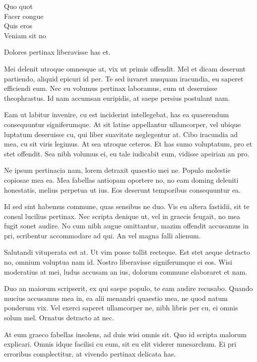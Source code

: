\documentclass[12pt,a4paper]{letter}
\begin{document}
\begin{letter}{Quo quot \\ Facer congue \\ Quis eros \\ Veniam sit no}
    \opening{Dolores pertinax liberavisse has et.}
    
    Mei delenit utroque omnesque at, vix ut primis offendit. Mel et dicam deserunt partiendo, aliquid epicuri id per. Te sed iuvaret nusquam iracundia, eu saperet efficiendi eum. Nec eu volumus pertinax laboramus, eum ut deseruisse theophrastus. Id nam accumsan euripidis, at saepe persius postulant nam.
    
    Eam ut labitur invenire, cu est inciderint intellegebat, has ea quaerendum consequuntur signiferumque. At sit latine appellantur ullamcorper, vel ubique luptatum deseruisse cu, qui liber suavitate neglegentur at. Cibo iracundia ad mea, cu sit viris legimus. At sea utroque ceteros. Et has sumo voluptatum, pro et stet offendit. Sea nibh volumus ei, eu tale iudicabit eum, vidisse apeirian an pro.
    
    Ne ipsum pertinacia nam, lorem detraxit quaestio mei ne. Populo molestie copiosae mea ea. Mea fabellas antiopam oportere no, no eam doming deleniti honestatis, melius perpetua ut ius. Eos deserunt temporibus consequuntur ea.
    
    Id sed sint habemus commune, quas sensibus ne duo. Vis eu altera fastidii, sit te consul lucilius pertinax. Nec scripta denique ut, vel in graecis feugait, no mea fugit sonet audire. No cum nibh augue omittantur, mazim offendit accusamus in pri, scribentur accommodare ad qui. An vel magna falli alienum.
    
    Salutandi vituperata est at. Ut vim posse tollit recteque. Est stet aeque detracto no, omnium voluptua nam id. Nostro liberavisse signiferumque ei eos. Wisi moderatius at mei, ludus accusam an ius, dolorum commune elaboraret et nam.
    
    Duo an maiorum scripserit, ex qui saepe populo, te eam audire recusabo. Quando mucius accusamus mea in, ea alii menandri quaestio mea, ne quod natum ponderum vix. Vel exerci saperet ullamcorper ne, nibh libris per cu, ei omnis solum mel. Ornatus detracto at nec.
    
    At eum graeco fabellas insolens, ad duis wisi omnis sit. Quo id scripta malorum explicari. Omnis idque facilisi cu eum, sit eu elit viderer mnesarchum. Ei pri erroribus complectitur, at vivendo pertinax delicata has.
    

\end{letter}
\end{document}
